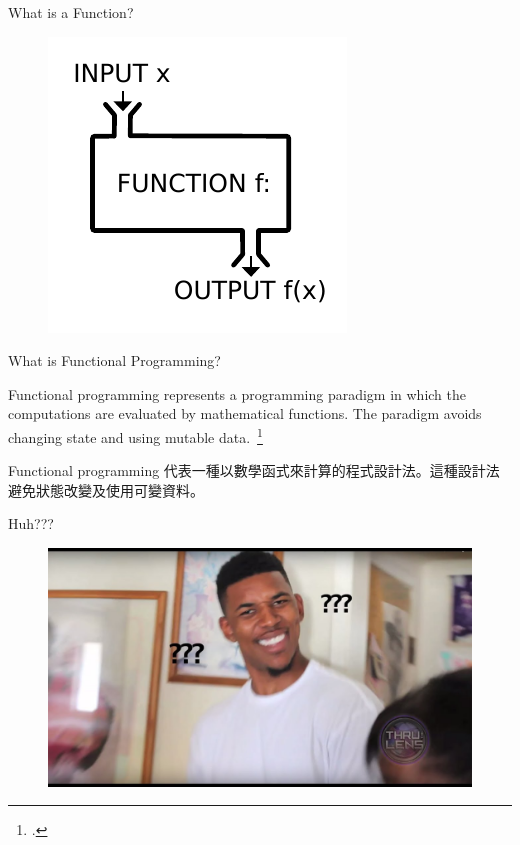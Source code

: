 \documentclass[10pt]{beamer}
\begin{document}
\begin{frame}[fragile]{What is a Function?}

  \begin{figure}
  \includegraphics[width=.75\textwidth,keepaspectratio] {Function_machine2.pdf}
  \end{figure}
\end{frame}

\begin{frame}{What is Functional Programming?}

{\large Functional programming represents a programming paradigm in which the computations are evaluated by mathematical functions. The paradigm avoids changing state and using mutable data.~\footcite{Nita2019}%
}   


{\normalsize Functional programming 代表一種以數學函式來計算的程式設計法。這種設計法避免狀態改變及使用可變資料。
}

\end{frame}

\begin{frame}{Huh???}
    
  \begin{figure}
  \includegraphics[width=.75\textwidth,keepaspectratio] {huh.jpg}
  \end{figure}
\end{frame}
\end{document}
